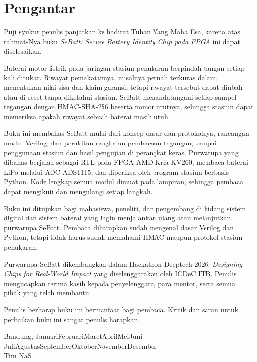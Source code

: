 \documentclass[11pt,a4paper]{article}
\newcommand{\tanggalindo}{%
  \number\day{} %
  \ifcase\month\or Januari\or Februari\or Maret\or April\or Mei\or Juni\or
    Juli\or Agustus\or September\or Oktober\or November\or Desember\fi
  \space \number\year}
\begin{document}
\pagestyle{plain}

\section*{Pengantar}

Puji syukur penulis panjatkan ke hadirat Tuhan Yang Maha Esa, karena atas rahmat-Nya buku
\textit{SeBatt: Secure Battery Identity Chip pada FPGA} ini dapat diselesaikan.

Baterai motor listrik pada jaringan stasiun penukaran berpindah tangan setiap kali ditukar.
Riwayat pemakaiannya, misalnya pernah terkuras dalam, menentukan nilai sisa dan klaim garansi,
tetapi riwayat tersebut dapat diubah atau di-reset tanpa diketahui stasiun. SeBatt menandatangani
setiap sampel tegangan dengan HMAC-SHA-256 beserta nomor urutnya, sehingga stasiun dapat
memeriksa apakah riwayat sebuah baterai masih utuh.

Buku ini membahas SeBatt mulai dari konsep dasar dan protokolnya, rancangan modul Verilog, dan
perakitan rangkaian pembacaan tegangan, sampai penggunaan stasiun dan hasil pengujian di
perangkat keras. Purwarupa yang dibahas berjalan sebagai RTL pada FPGA AMD Kria KV260, membaca
baterai LiPo melalui ADC ADS1115, dan diperiksa oleh program stasiun berbasis Python. Kode
lengkap semua modul dimuat pada lampiran, sehingga pembaca dapat mengikuti dan mengulangi setiap
langkah.

Buku ini ditujukan bagi mahasiswa, peneliti, dan pengembang di bidang sistem digital dan sistem
baterai yang ingin menjalankan ulang atau melanjutkan purwarupa SeBatt. Pembaca diharapkan sudah
mengenal dasar Verilog dan Python, tetapi tidak harus sudah memahami HMAC maupun protokol
stasiun penukaran.

Purwarupa SeBatt dikembangkan dalam Hackathon Deeptech 2026: \textit{Designing Chips for
Real-World Impact} yang diselenggarakan oleh ICDeC ITB. Penulis mengucapkan terima kasih kepada
penyelenggara, para mentor, serta semua pihak yang telah membantu.

Penulis berharap buku ini bermanfaat bagi pembaca. Kritik dan saran untuk perbaikan buku ini
sangat penulis harapkan.

\vspace{1cm}
\begin{flushright}
  Bandung, \tanggalindo\\[1.5cm]
  Tim NaS
\end{flushright}
\end{document}
